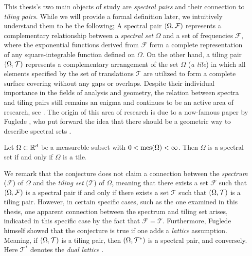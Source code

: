 \documentclass[../thesis.tex]{subfiles}
\begin{document}
This thesis's two main objects of study are \emph{spectral pairs} and their connection to \emph{tiling pairs}. While we will provide a formal definition later, we intuitively understand them to be the following; A spectral pair $(\Omega,\mathcal{F})$ represents a complementary relationship between a \emph{spectral set} $\Omega$ and a set of frequencies $\mathcal{F}$, where the exponential functions derived from $\mathcal{F}$ form a complete representation of any square-integrable function defined on $\Omega$. On the other hand, a tiling pair $(\Omega,\mathcal{T})$ represents a complementary arrangement of the set $\Omega$ (\emph{a tile}) in which all elements specified by the set of translations $\mathcal{T}$ are utilized to form a complete surface covering without any gaps or overlaps. Despite their individual importance in the fields of analysis and geometry, the relation between spectra and tiling pairs still remains an enigma and continues to be an active area of research, see \cite{levFugledeConjectureConvex2022,kissFugledeConjectureHolds2022}. The origin of this area of research is due to a now-famous paper by Fuglede \cite{fugledeCommutingSelfadjointPartial1974}, who put forward the idea that there should be a geometric way to describe spectral sets \cite{lagariasOrthonormalBasesExponentials2000,liDualityPropertiesSpectra2010}. 

\begin{conjecture}
    Let $\Omega\subset \mathbb{R}^d$ be a measureble subset with $0<\operatorname{mes}(\Omega)<\infty$. Then $\Omega$ is a spectral set if and only if $\Omega$ is a tile. 
\end{conjecture}

We remark that the conjecture does not claim a connection between the \emph{spectrum} ($\mathcal{F}$) of $\Omega$ and the \emph{tiling set} ($\mathcal{T}$) of $\Omega$, meaning that there exists a set $\mathcal{F}$ such that $(\Omega,\mathcal{F})$ is a spectral pair if and only if there exists a set $\mathcal{T}$ such that $(\Omega,\mathcal{T})$ is a tiling pair. However, in certain specific cases, such as the one examined in this thesis, one apparent connection between the spectrum and tiling set arises, indicated in this specific case by the fact that $\mathcal{F}=\mathcal{T}$. Furthermore, Fuglede himself showed that the conjecture is true if one adds a \emph{lattice} assumption. Meaning, if $(\Omega,\mathcal{T})$ is a tiling pair, then $(\Omega,\mathcal{T^*})$ is a spectral pair, and conversely. Here $\mathcal{T^*}$ denotes the \emph{dual lattice} \cite{fugledeCommutingSelfadjointPartial1974}.
\end{document}
